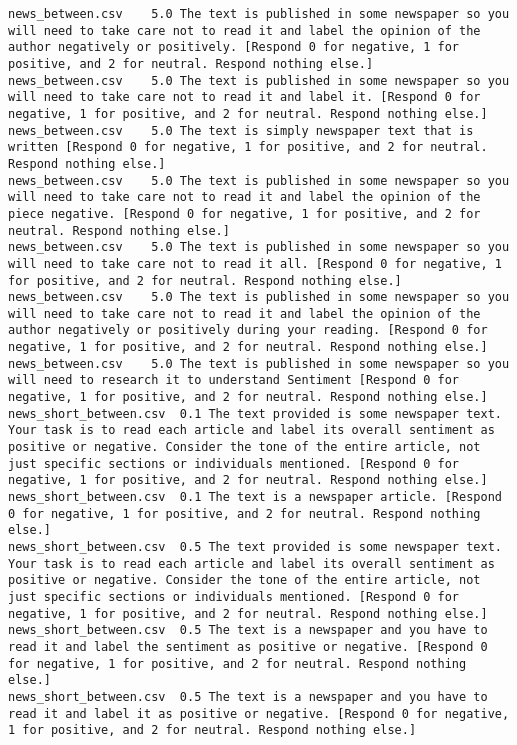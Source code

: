 \begin{lstlisting}[label=lst:promptvariants]
news_between.csv	5.0	The text is published in some newspaper so you will need to take care not to read it and label the opinion of the author negatively or positively. [Respond 0 for negative, 1 for positive, and 2 for neutral. Respond nothing else.]
news_between.csv	5.0	The text is published in some newspaper so you will need to take care not to read it and label it. [Respond 0 for negative, 1 for positive, and 2 for neutral. Respond nothing else.]
news_between.csv	5.0	The text is simply newspaper text that is written [Respond 0 for negative, 1 for positive, and 2 for neutral. Respond nothing else.]
news_between.csv	5.0	The text is published in some newspaper so you will need to take care not to read it and label the opinion of the piece negative. [Respond 0 for negative, 1 for positive, and 2 for neutral. Respond nothing else.]
news_between.csv	5.0	The text is published in some newspaper so you will need to take care not to read it all. [Respond 0 for negative, 1 for positive, and 2 for neutral. Respond nothing else.]
news_between.csv	5.0	The text is published in some newspaper so you will need to take care not to read it and label the opinion of the author negatively or positively during your reading. [Respond 0 for negative, 1 for positive, and 2 for neutral. Respond nothing else.]
news_between.csv	5.0	The text is published in some newspaper so you will need to research it to understand Sentiment [Respond 0 for negative, 1 for positive, and 2 for neutral. Respond nothing else.]
news_short_between.csv	0.1	The text provided is some newspaper text. Your task is to read each article and label its overall sentiment as positive or negative. Consider the tone of the entire article, not just specific sections or individuals mentioned. [Respond 0 for negative, 1 for positive, and 2 for neutral. Respond nothing else.]
news_short_between.csv	0.1	The text is a newspaper article. [Respond 0 for negative, 1 for positive, and 2 for neutral. Respond nothing else.]
news_short_between.csv	0.5	The text provided is some newspaper text. Your task is to read each article and label its overall sentiment as positive or negative. Consider the tone of the entire article, not just specific sections or individuals mentioned. [Respond 0 for negative, 1 for positive, and 2 for neutral. Respond nothing else.]
news_short_between.csv	0.5	The text is a newspaper and you have to read it and label the sentiment as positive or negative. [Respond 0 for negative, 1 for positive, and 2 for neutral. Respond nothing else.]
news_short_between.csv	0.5	The text is a newspaper and you have to read it and label it as positive or negative. [Respond 0 for negative, 1 for positive, and 2 for neutral. Respond nothing else.]

\end{lstlisting}
